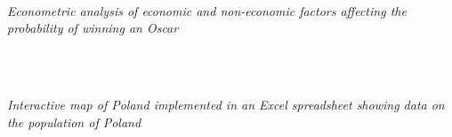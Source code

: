 \documentclass{cls/gml_cv_sets}
\begin{document}
\begin{paracol}{2}
{{%
 \\ 

\textit{\footnotesize Econometric analysis of economic and non-economic 
factors affecting the probability of winning an Oscar} \\ \vspace{-0.75em}

 \\ \vspace{0.6em}

 \\ 

\textit{\footnotesize Interactive map of Poland implemented in an Excel 
spreadsheet showing data on the population of Poland} \\ \vspace{-0.75em}

}}

\switchcolumn


\end{paracol}
\end{document}
